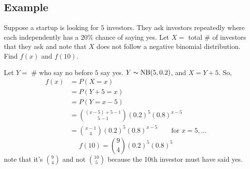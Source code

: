 \subsection{Example}
Suppose a startup is looking for $ 5 $ investors. They ask
investors repeatedly where each independently has a $ 20\% $ chance
of saying yes. Let $ X= $ total \# of investors that they ask and
note that $ X $ does not follow a negative binomial distribution.
Find $ f(x) $ and $ f(10) $.

Let $ Y= $ \# who say no before $ 5 $ say yes.
$ Y\thicksim\operatorname{NB}(5,0.2) $, and $ X=Y+5 $. So,
\begin{align*}
    f(x)&=P(X=x)\\
    &=P(Y+5=x)\\
    &=P(Y=x-5)\\
    &=\binom{(x-5)+5-1}{5-1}(0.2)^5(0.8)^{x-5}\\
    &=\binom{x-1}{4}(0.2)^5(0.8)^{x-5} \qquad \text{for } x=5,\ldots
\end{align*}
\[ f(10)=\binom{9}{4}(0.2)^5(0.8)^5 \]
note that it's $ \binom{9}{4} $ and not $ \binom{10}{5} $ because
the 10th investor must have said yes.
